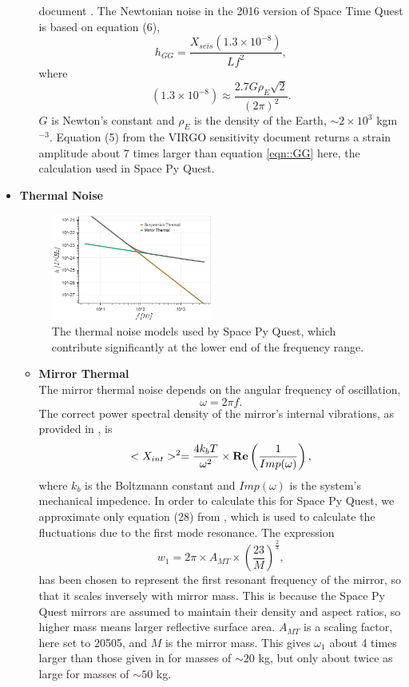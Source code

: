 \documentclass{article}
\begin{document}
\begin{itemize}
\begin{itemize}
    document \cite{VIRGO}. The Newtonian noise in the 2016 version of
    Space Time Quest is based on equation (6),
    \begin{equation}
    \label{eqn::GG}
    h_{GG} = \frac{X_{seis}(1.3\times10^{-8})}{Lf^2},
    \end{equation}
    where
    \[
    (1.3\times10^{-8}) \approx \frac{2.7G\rho_E\sqrt{2}}{(2\pi)^2}.
    \]
   $G$ is Newton's constant and $\rho_E$ is the density of the Earth,
   $\sim 2 \times 10^3$ kgm$^{-3}$. Equation (5) from the VIRGO
   sensitivity document returns a strain amplitude about 7 times
   larger than equation \ref{eqn::GG} here, the calculation used in
   Space Py Quest.
   \end{itemize}
   \item \textbf{Thermal Noise} \\
    \begin{figure}[h!]
    \centering
    \includegraphics[width=0.5\textwidth]{SPQ_aLIGO_thermal.png}
    \caption{The thermal noise models used by Space Py Quest, which contribute significantly at the lower end of the frequency range.}
    \label{fig:thermal}
    \end{figure}
    \begin{itemize}
    \item \textbf{Mirror Thermal} \\
    The mirror thermal noise depends on the angular frequency of oscillation,
    \[
    \omega = 2\pi f.
    \]
     The correct power spectral density of the mirror's internal vibrations, as provided in \cite{VIRGO}, is
    \[
    <X_{int}>^2 = \frac{4k_bT}{\omega^2} \times\text{\textbf{Re}}\left(\frac{1}{Imp(\omega)}\right),
    \]
    where $k_b$ is the Boltzmann constant and $Imp(\omega)$ is the
    system's mechanical impedence. In order to calculate this for
    Space Py Quest, we  approximate only equation (28) from
    \cite{VIRGO}, which is used to calculate the fluctuations due to
    the first mode resonance. The expression
    \[
    w_1 = 2\pi \times A_{MT} \times \left(\frac{23}{M}\right)^{\frac{2}{3}}, 
    \]
    has been chosen to represent the first resonant frequency of the
    mirror, so that it scales inversely with mirror mass. This is
    because the Space Py Quest mirrors are assumed to maintain their
    density and aspect ratios, so higher mass means larger reflective
    surface area. $A_{MT}$ is a scaling factor, here set to 20505, and
    $M$ is the mirror mass. This gives $\omega_1$ about 4 times larger
    than those given in \cite{VIRGO} for masses of $\sim 20$ kg, but
    only about twice as large for masses of $\sim 50$ kg. 


\end{itemize}
\end{itemize}
\end{document}
